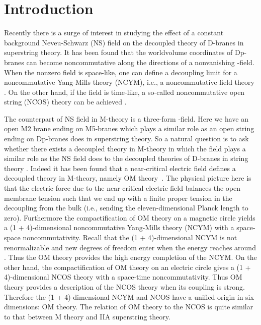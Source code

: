 \documentclass[a4paper,12pt]{article}
\providecommand{\sect}[1]{\setcounter{equation}{0}\section{#1}}
\begin{document}
\begin{titlepage}
\end{titlepage}

\newpage
\renewcommand{\thefootnote}{\arabic{footnote}}
\setcounter{footnote}{0}
\setcounter{page}{2}


\sect{Introduction}
Recently there is a surge of interest in studying the effect of a
constant background Neveu-Schwarz (NS)  \coordHE{}
field on the decoupled theory of D-branes in superstring theory.
 It has been found that the worldvolume
coordinates of Dp-branes can become noncommutative along the directions
of a nonvanishing  \coordHE{}-field.
When the nonzero \coordHE{} field is space-like, one can define a decoupling
limit for a noncommutative Yang-Mills theory (NCYM), i.e., a
noncommutative field theory \cite{SW}. On the other hand, 
if the \coordHE{} field is time-like, a so-called noncommutative open string
(NCOS) theory can be 
achieved \cite{SST,Gop1}.

   
The counterpart of NS \coordHE{} field in M-theory is a three-form  \coordHE{}-field.
Here we have an open M2 brane ending on M5-branes which plays a similar
role as an open string ending on Dp-branes does in superstring 
theory. So a natural question is to ask whether there exists a decoupled
theory in M-theory in which the \coordHE{} field plays 
a similar role as the NS \coordHE{} field does to the decoupled theories of
D-branes in string theory \cite{SW,CHL,Chak,Berg,Kawa,Berm}. 
 Indeed it has been found that a near-critical electric field \coordHE{}
defines a decoupled theory in M-theory, namely OM theory~\cite{Gop2,
Berg2}. The physical picture here is that the electric force due to 
the near-critical electric field \coordHE{} balances the open membrane tension
such that we end up with a finite proper tension in the decoupling from
the bulk (i.e., sending the eleven-dimensional Planck length to zero).
 Furthermore the compactification of 
OM theory on a magnetic circle yields a (1 + 4)-dimensional
noncommutative Yang-Mills theory (NCYM) with a space-space noncommutativity.
Recall that the (1 + 4)-dimensional NCYM is not renormalizable and 
new degrees of freedom enter when the energy
reaches around \coordHE{}. Thus the OM 
theory provides the high energy completion of the NCYM.  On the 
other hand, the compactification of OM theory on an electric circle
gives a (1 + 4)-dimensional NCOS
theory with a space-time noncommutativity.
Thus OM theory provides a description of the NCOS theory when its
coupling is strong.
Therefore the (1 + 4)-dimensional NCYM and NCOS have a unified origin in six 
dimensions: OM theory.  The relation of OM theory to the NCOS is quite 
similar to that between  M theory and IIA superstring theory.    
\end{document}
